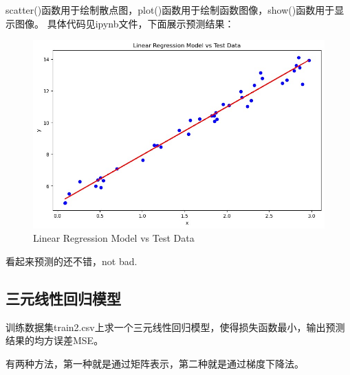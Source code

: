 \documentclass[12pt,a4paper,oneside]{article}
\begin{document}
scatter()函数用于绘制散点图，plot()函数用于绘制函数图像，show()函数用于显示图像。
具体代码见ipynb文件，下面展示预测结果：
\begin{figure}[H]
    \centering
    \begin{minipage}[b]{0.6\textwidth}
        \centering
        \includegraphics[width=\textwidth]{LR.jpg}
        \caption{Linear Regression Model vs Test Data}
        \label{fig:code}
    \end{minipage}
\end{figure}
看起来预测的还不错，not bad.
\subsection{三元线性回归模型}
训练数据集train2.csv上求一个三元线性回归模型，使得损失函数最小，输出预测结果的均方误差MSE。

有两种方法，第一种就是通过矩阵表示，第二种就是通过梯度下降法。
\end{document}
